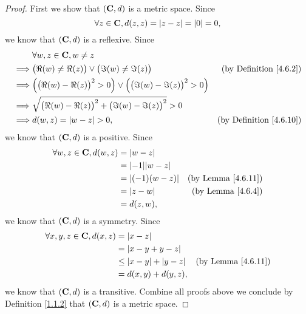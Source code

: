 \begin{proof}
    First we show that \((\mathbf{C}, d)\) is a metric space.
    Since
    \[
        \forall z \in \mathbf{C}, d(z, z) = \left\lvert z - z\right\rvert = \left\lvert0\right\rvert = 0,
    \]
    we know that \((\mathbf{C}, d)\) is a reflexive.
    Since
    \begin{align*}
                 & \forall w, z \in \mathbf{C}, w \neq z                                                                                                  \\
        \implies & \big(\Re(w) \neq \Re(z)\big) \lor \big(\Im(w) \neq \Im(z)\big)                           & \text{(by Definition \ref{4.6.2})}  \\
        \implies & \Big(\big(\Re(w) - \Re(z)\big)^2 > 0\Big) \lor \Big(\big(\Im(w) - \Im(z)\big)^2 > 0\Big)                                       \\
        \implies & \sqrt{\big(\Re(w) - \Re(z)\big)^2 + \big(\Im(w) - \Im(z)\big)^2} > 0                                                           \\
        \implies & d(w, z) = \left\lvert w - z\right\rvert > 0,                                                               & \text{(by Definition \ref{4.6.10})}
    \end{align*}
    we know that \((\mathbf{C}, d)\) is a positive.
    Since
    \begin{align*}
        \forall w, z \in \C, d(w, z) & = \abs{w - z}                                           \\
                                     & = \abs{-1} \abs{w - z}                                  \\
                                     & = \abs{(-1) (w - z)}   & \text{(by Lemma \ref{4.6.11})} \\
                                     & = \abs{z - w}          & \text{(by Lemma \ref{4.6.4})}  \\
                                     & = d(z, w),
    \end{align*}
    we know that \((\mathbf{C}, d)\) is a symmetry.
    Since
    \begin{align*}
        \forall x, y, z \in \mathbf{C}, d(x, z) & = \left\lvert x - z\right\rvert                                                   \\
                                        & = \left\lvert x - y + y - z\right\rvert                                           \\
                                        & \leq \left\lvert x - y\right\rvert + \left\lvert y - z\right\rvert & \text{(by Lemma \ref{4.6.11})} \\
                                        & = d(x, y) + d(y, z),
    \end{align*}
    we know that \((\mathbf{C}, d)\) is a transitive.
    Combine all proofs above we conclude by Definition \ref{1.1.2} that \((\mathbf{C}, d)\) is a metric space.


\end{proof}

